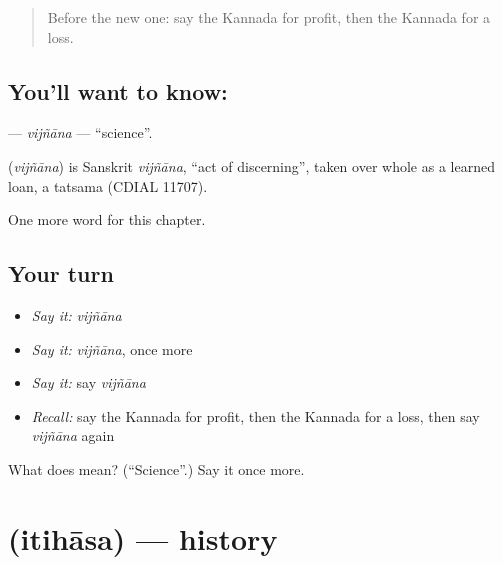 \label{lesson:KA-C233-vijnana}



\begin{quote}
Before the new one: say the Kannada for profit, then the Kannada for a loss.
\end{quote}

\subsection*{You'll want to know: }
\textbf{} — \emph{vijñāna} — \textquotedblleft{}science\textquotedblright{}.

\begin{cousinweb}
\textbf{} (\emph{vijñāna}) is Sanskrit \emph{vijñāna}, \textquotedblleft{}act of discerning\textquotedblright{}, taken over whole as a learned loan, a tatsama (CDIAL 11707).
\end{cousinweb}

\begin{grammarlens}[title={What you've built}]
One more word for this chapter.
\end{grammarlens}

\subsection*{Your turn}
\begin{itemize}
\raggedright
  \item \emph{Say it:} \emph{vijñāna}
  \item \emph{Say it:} \emph{vijñāna}, once more
  \item \emph{Say it:} say \emph{vijñāna}
  \item \emph{Recall:} say the Kannada for profit, then the Kannada for a loss, then say \emph{vijñāna} again
\end{itemize}

\begin{tcolorbox}[breakable,colback=teal!4,colframe=teal!35!black,title={Before you move on}]
What does  mean? (\textquotedblleft{}Science\textquotedblright{}.) Say it once more.
\end{tcolorbox}
\section[\texorpdfstring{\kn{ಇತಿಹಾಸ} (itihāsa)}{ಇತಿಹಾಸ (itihāsa)}]{ (itihāsa) — history}

\label{lesson:KA-C233-itihasa}



